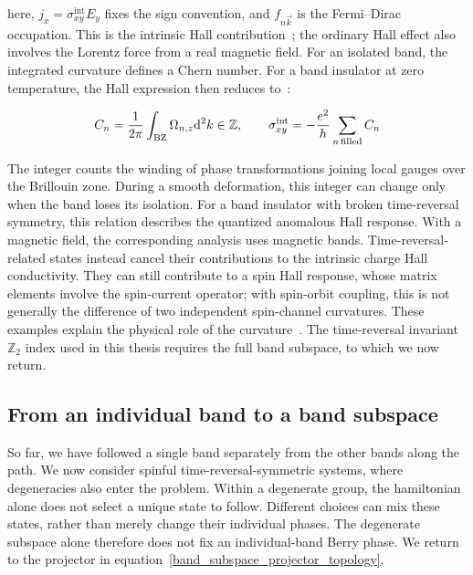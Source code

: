 here, $j_x=\sigma_{xy}^{\mathrm{int}}E_y$ fixes the sign convention,
and $f_{n\vec{k}}$ is the Fermi--Dirac occupation.
This is the intrinsic Hall contribution~\cite{nagaosa2010anomalous}; the ordinary Hall effect also involves the Lorentz force from a real magnetic field.
For an isolated band, the integrated curvature defines a Chern number.
For a band insulator at zero temperature, the Hall expression then reduces to~\cite{thouless1982quantized}:

\begin{equation}
    C_n=\frac{1}{2\mathrm{\pi}}\int_\mathrm{BZ}\Omega_{n,z}\mathrm{d}^2k\in\mathbb{Z},
    \qquad \sigma_{xy}^{\mathrm{int}}=-\frac{e^2}{h}\sum_{n\,\mathrm{filled}}C_n
\label{chern_hall_relation_appendix}
\end{equation}

The integer counts the winding of phase transformations joining local gauges over the Brillouin zone.
During a smooth deformation, this integer can change only when the band loses its isolation.
For a band insulator with broken time-reversal symmetry, this relation describes the quantized anomalous Hall response.
With a magnetic field, the corresponding analysis uses magnetic bands.
Time-reversal-related states instead cancel their contributions to the intrinsic charge Hall conductivity.
They can still contribute to a spin Hall response, whose matrix elements involve the spin-current operator;
with spin-orbit coupling, this is not generally the difference of two independent spin-channel curvatures.
These examples explain the physical role of the curvature~\cite{xiao2010berry}.
The time-reversal invariant $\mathbb{Z}_2$ index used in this thesis requires the full band subspace, to which we now return.

\subsection{From an individual band to a band subspace}

So far, we have followed a single band separately from the other bands along the path.
We now consider spinful time-reversal-symmetric systems, where degeneracies also enter the problem.
Within a degenerate group, the hamiltonian alone does not select a unique state to follow.
Different choices can mix these states, rather than merely change their individual phases.
The degenerate subspace alone therefore does not fix an individual-band Berry phase.
We return to the projector in equation~\eqref{band_subspace_projector_topology}.

